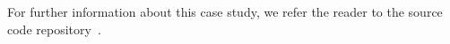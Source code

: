 For further information about this case study, we refer the reader to the source code repository~\cite{migratingtable-src}.





